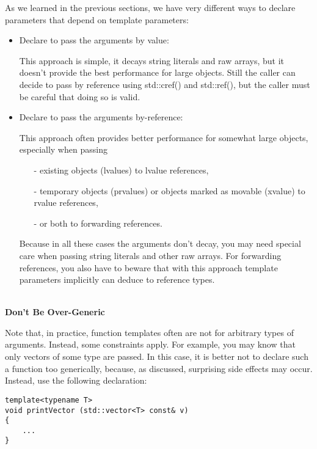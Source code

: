 As we learned in the previous sections, we have very different ways to declare parameters that depend on template parameters:

\begin{itemize}
\item 
Declare to pass the arguments by value:

This approach is simple, it decays string literals and raw arrays, but it doesn’t provide the best performance for large objects. Still the caller can decide to pass by reference using std::cref() and std::ref(), but the caller must be careful that doing so is valid.

\item 
Declare to pass the arguments by-reference:

This approach often provides better performance for somewhat large objects, especially when passing

\begin{itemize}
\item[-]
existing objects (lvalues) to lvalue references,

\item[-]
temporary objects (prvalues) or objects marked as movable (xvalue) to rvalue references,

\item[-]
or both to forwarding references.
\end{itemize}

Because in all these cases the arguments don’t decay, you may need special care when passing string literals and other raw arrays. For forwarding references, you also have to beware that with this approach template parameters implicitly can deduce to reference types.
\end{itemize}

\hspace*{\fill} \\ %
\noindent
\textbf{Don’t Be Over-Generic}

Note that, in practice, function templates often are not for arbitrary types of arguments. Instead, some constraints apply. For example, you may know that only vectors of some type are passed. In this case, it is better not to declare such a function too generically, because, as discussed, surprising side effects may occur. Instead, use the following declaration:

\begin{lstlisting}[style=styleCXX]
template<typename T>
void printVector (std::vector<T> const& v)
{
	...
}
\end{lstlisting}


